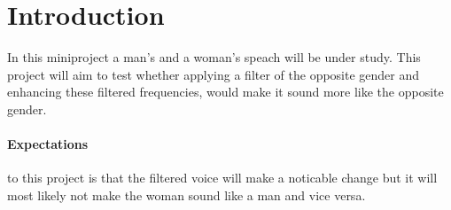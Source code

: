
\section{Introduction}
In this miniproject a man's and a woman's speach will be under study. This project will aim to test whether applying a filter of the opposite gender and enhancing these filtered frequencies, would make it sound more like the opposite gender.

\paragraph{Expectations} to this project is that the filtered voice will make a noticable change but it will most likely not make the woman sound like a man and vice versa.
